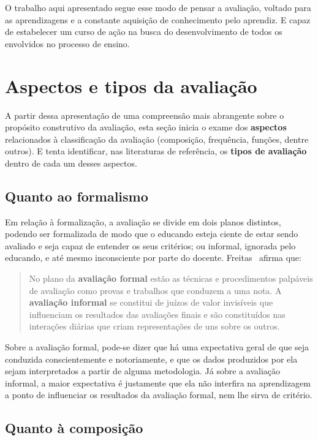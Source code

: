 O trabalho aqui apresentado segue esse modo de pensar a avaliação, voltado para as aprendizagens e a constante aquisição de conhecimento pelo aprendiz. E capaz de estabelecer um curso de ação na busca do desenvolvimento de todos os envolvidos no processo de ensino.

\section{Aspectos e tipos da avaliação}%

A partir dessa apresentação de uma compreensão mais abrangente sobre o propósito construtivo da avaliação, esta seção inicia o exame dos \textbf{aspectos} relacionados à classificação da avaliação (composição, frequência, funções, dentre outros). E tenta identificar, nas literaturas de referência, os \textbf{tipos de avaliação} dentro de cada um desses aspectos.

\subsection{Quanto ao formalismo}%
Em relação à formalização, a  avaliação se divide em dois planos distintos, podendo ser formalizada de modo que o educando esteja ciente de estar sendo avaliado e seja capaz de entender os seus critérios; ou informal, ignorada pelo educando, e até mesmo inconsciente por parte do docente. Freitas~\cite{de2003ciclos} afirma que:

\begin{quote}
No plano da \textbf{avaliação formal} estão as técnicas e procedimentos palpáveis de avaliação como provas e trabalhos que conduzem a uma nota. A \textbf{avaliação informal} se constitui de juízos de valor invisíveis que influenciam os resultados das avaliações finais e são constituídos nas interações diárias que criam representações de uns sobre os outros.~\cite{de2003ciclos} 
\end{quote}%

Sobre a avaliação formal, pode-se dizer que há uma expectativa geral de que seja conduzida conscientemente e notoriamente, e que os dados produzidos por ela sejam interpretados a partir de alguma metodologia. Já sobre a avaliação informal, a maior expectativa é justamente que ela não interfira na aprendizagem a ponto de influenciar os resultados da avaliação formal, nem lhe sirva de critério.

\subsection{Quanto à composição}%

